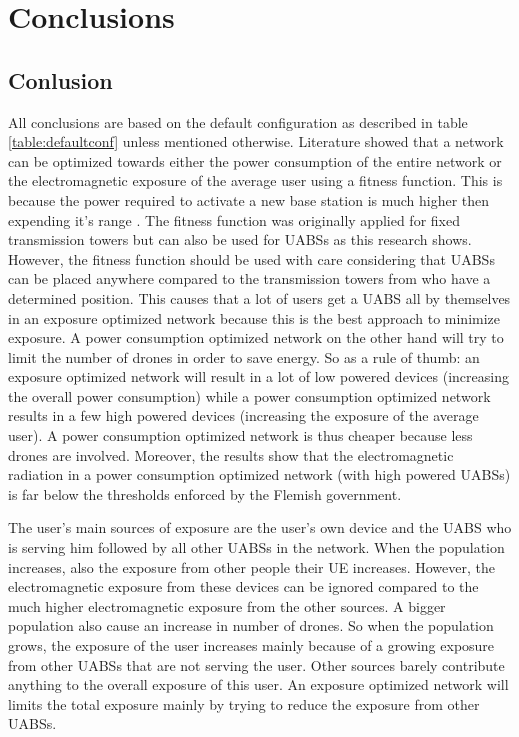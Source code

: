 \chapter{Conclusions}
\label{chap:conclusions}

\section{Conlusion}
All conclusions are based on the default configuration as described in table \ref{table:defaultconf} unless mentioned otherwise.
Literature showed that a network can be optimized towards either the power consumption of the entire network 
or the electromagnetic exposure of the average user using a fitness function. This is because the power required to activate a new 
base station is much higher then expending it's range \cite{J1}.
The fitness function was originally applied for fixed transmission towers but can also be used 
for \gls{UABS}s as this research shows.
However, the fitness function should be used with care considering that \gls{UABS}s can be placed anywhere compared to 
the transmission towers from \cite{J1} who have a determined position. This causes that a lot of users get a \gls{UABS}
all by themselves in an exposure optimized network because this is the best approach to minimize exposure.
A power consumption optimized network on the other hand will try to limit the number of drones 
in order to save energy. So as a rule of thumb: an exposure optimized network will result in a lot of low powered devices (increasing the overall power consumption)
while a power consumption optimized network results in a few high powered devices (increasing the exposure of the average user).
A power consumption optimized network is thus cheaper because less drones are involved. 
Moreover, the results show that the electromagnetic radiation in a power consumption optimized network (with high powered \gls{UABS}s)
is far below the thresholds enforced by the Flemish government.

The user's main sources of exposure are the user's own device and the \gls{UABS} who is serving him followed by all
other \gls{UABS}s in the network. 
When the population increases, also the exposure from other people their \gls{UE} increases. However, the electromagnetic
 exposure from these devices can be ignored compared to the much higher electromagnetic exposure from the other sources. 
A bigger population also cause an increase in number of drones. So when the population grows, the exposure of the 
user increases mainly because of a growing exposure from other \gls{UABS}s that are not serving the user. Other sources barely contribute anything to the overall exposure
of this user. An exposure optimized network will limits the total exposure mainly by trying to reduce the exposure from other \gls{UABS}s.

